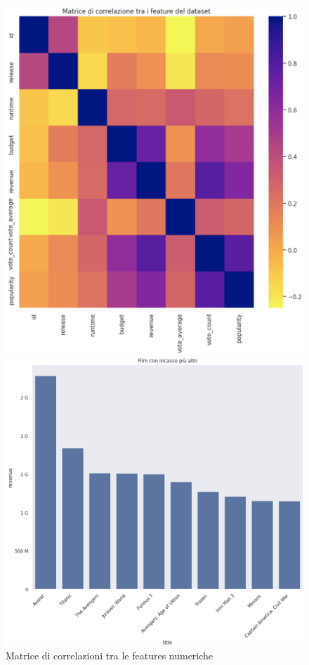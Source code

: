 \documentclass{report}
\begin{document}
        \begin{figure}[H]
            \centering
            \begin{minipage}{.45\textwidth}
                \centering
                \includegraphics[width=1\linewidth]{EDA/eda3.png}
                \caption{Matrice di correlazioni tra le features numeriche}
                \label{fig:enter-label}
            \end{minipage}
            \begin{minipage}{.45\textwidth}
                \centering
                \includegraphics[width=1\linewidth]{EDA/eda6.png}

\end{minipage}
\end{figure}
\end{document}
